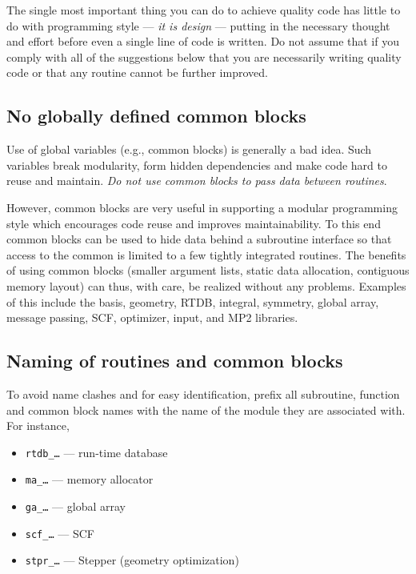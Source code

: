 The single most important thing you can do to achieve quality code has
little to do with programming style --- {\em it is design} --- putting
in the necessary thought and effort before even a single line of code
is written.  Do not assume that if you comply with all of the
suggestions below that you are necessarily writing quality code or
that any routine cannot be further improved.

\subsection{No globally defined common blocks}

Use of global variables (e.g., common blocks) is generally a bad idea.
Such variables break modularity, form hidden dependencies and make
code hard to reuse and maintain.  {\em Do not use common blocks to
  pass data between routines}.

However, common blocks are very useful in supporting a modular
programming style which encourages code reuse and improves
maintainability.  To this end common blocks can be used to hide data
behind a subroutine interface so that access to the common is limited
to a few tightly integrated routines.  The benefits of using common
blocks (smaller argument lists, static data allocation, contiguous
memory layout) can thus, with care, be realized without any problems.
Examples of this include the basis, geometry, RTDB, integral,
symmetry, global array, message passing, SCF, optimizer, input, and
MP2 libraries.

\subsection{Naming of routines and common blocks}

To avoid name clashes and for easy identification, prefix all
subroutine, function and common block names with the name of the
module they are associated with.  For instance,
\begin{itemize}
\item {\tt rtdb\_\ldots} --- run-time database
\item {\tt ma\_\ldots} --- memory allocator
\item {\tt ga\_\ldots} --- global array
\item {\tt scf\_\ldots} --- SCF
\item {\tt stpr\_\ldots} --- Stepper (geometry optimization)
\end{itemize}

